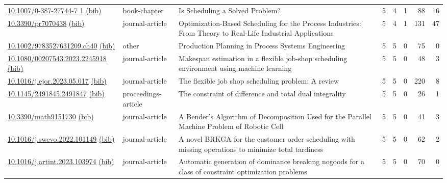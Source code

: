 {\begin{longtable}{p{5cm}lp{11cm}rrrrr}
\href{http://dx.doi.org/10.1007/0-387-27744-7_1}{10.1007/0-387-27744-7 1} \href{https://www.doi2bib.org/bib/10.1007/0-387-27744-7_1}{(bib)} & book-chapter & Is Scheduling a Solved Problem? & 5 & 4 & 1 & 88 & 16 \\
\href{http://dx.doi.org/10.3390/pr7070438}{10.3390/pr7070438} \href{https://www.doi2bib.org/bib/10.3390/pr7070438}{(bib)} & journal-article & Optimization-Based Scheduling for the Process Industries: From Theory to Real-Life Industrial Applications & 5 & 4 & 1 & 131 & 47 \\
\href{http://dx.doi.org/10.1002/9783527631209.ch40}{10.1002/9783527631209.ch40} \href{https://www.doi2bib.org/bib/10.1002/9783527631209.ch40}{(bib)} & other & Production Planning in Process Systems Engineering & 5 & 5 & 0 & 75 & 0 \\
\href{http://dx.doi.org/10.1080/00207543.2023.2245918}{10.1080/00207543.2023.2245918} \href{https://www.doi2bib.org/bib/10.1080/00207543.2023.2245918}{(bib)} & journal-article & Makespan estimation in a flexible job-shop scheduling environment using machine learning & 5 & 5 & 0 & 48 & 3 \\
\href{http://dx.doi.org/10.1016/j.ejor.2023.05.017}{10.1016/j.ejor.2023.05.017} \href{https://www.doi2bib.org/bib/10.1016/j.ejor.2023.05.017}{(bib)} & journal-article & The flexible job shop scheduling problem: A review & 5 & 5 & 0 & 220 & 8 \\
\href{http://dx.doi.org/10.1145/2491845.2491847}{10.1145/2491845.2491847} \href{https://www.doi2bib.org/bib/10.1145/2491845.2491847}{(bib)} & proceedings-article & The constraint of difference and total dual integrality & 5 & 5 & 0 & 26 & 1 \\
\href{http://dx.doi.org/10.3390/math9151730}{10.3390/math9151730} \href{https://www.doi2bib.org/bib/10.3390/math9151730}{(bib)} & journal-article & A Bender's Algorithm of Decomposition Used for the Parallel Machine Problem of Robotic Cell & 5 & 5 & 0 & 41 & 3 \\
\href{http://dx.doi.org/10.1016/j.swevo.2022.101149}{10.1016/j.swevo.2022.101149} \href{https://www.doi2bib.org/bib/10.1016/j.swevo.2022.101149}{(bib)} & journal-article & A novel BRKGA for the customer order scheduling with missing operations to minimize total tardiness & 5 & 5 & 0 & 62 & 2 \\
\href{http://dx.doi.org/10.1016/j.artint.2023.103974}{10.1016/j.artint.2023.103974} \href{https://www.doi2bib.org/bib/10.1016/j.artint.2023.103974}{(bib)} & journal-article & Automatic generation of dominance breaking nogoods for a class of constraint optimization problems & 5 & 5 & 0 & 70 & 0 \\

\end{longtable}}
